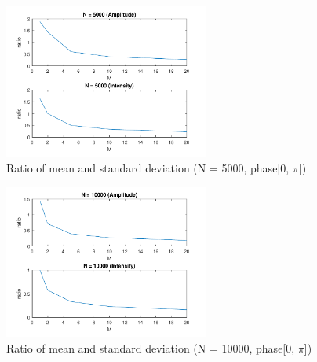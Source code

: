 \documentclass{article}
\begin{document}
\begin{figure}[H]
	\centering
	\includegraphics[width = 0.6\textwidth]{src/pi/ratio_5000.pdf}
	\caption{Ratio of mean and standard deviation (N = 5000, phase[0, $\pi$])}
	\label{fig:ratio-5000-pi}
\end{figure}
\begin{figure}[H]
	\centering
	\includegraphics[width = 0.6\textwidth]{src/pi/ratio_10000.pdf}
	\caption{Ratio of mean and standard deviation (N = 10000, phase[0, $\pi$])}
	\label{fig:ratio-10000-pi}
\end{figure}
\end{document}
